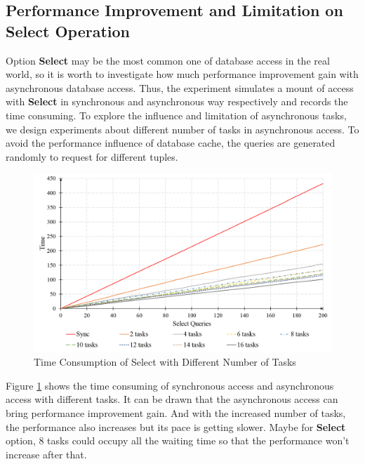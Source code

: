 \documentclass[onecolumn, conference, 12pt]{IEEEtran}
\begin{document}
	\subsection{Performance Improvement and Limitation on Select Operation}
	Option \textbf{Select} may be the most common one of database access in the real world, so it is worth to investigate how much performance improvement gain with asynchronous database access. Thus, the experiment simulates a mount of access with \textbf{Select} in synchronous and asynchronous way respectively and records the time consuming. To explore the influence and limitation of asynchronous tasks, we design experiments about different number of tasks in asynchronous access. To avoid the performance influence of database cache, the queries are generated randomly to request for different tuples. 
	
	\begin{figure}[!t]
		\centering
		\includegraphics[width=6.5in]{fig/select.png}
		\caption{Time Consumption of Select with Different Number of Tasks}
		\label{fig_select}
	\end{figure}
	
	Figure \ref{fig_select} shows the time consuming of synchronous access and asynchronous access with different tasks. It can be drawn that the asynchronous access can bring performance improvement gain. And with the increased number of tasks, the performance also increases but its pace is getting slower. Maybe for \textbf{Select} option, 8 tasks could occupy all the waiting time so that the performance won't increase after that. 
	
\end{document}

